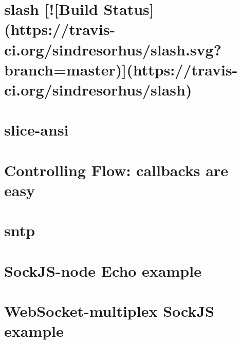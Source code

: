 \documentclass[twoside]{book}
\newcommand{\+}{\discretionary{\mbox{\scriptsize$\hookleftarrow$}}{}{}}
\begin{document}
\chapter{slash \mbox{[}!\mbox{[}Build Status\mbox{]}(https\+://travis-\/ci.org/sindresorhus/slash.svg?branch=master)\mbox{]}(https\+://travis-\/ci.org/sindresorhus/slash)}
\label{md__c_1_workspace_demo_src_main_script_node_modules_slash_readme}

\chapter{slice-\/ansi}
\label{md__c_1_workspace_demo_src_main_script_node_modules_slice-ansi_readme}

\chapter{Controlling Flow\+: callbacks are easy}
\label{md__c_1_workspace_demo_src_main_script_node_modules_slide__r_e_a_d_m_e}

\chapter{sntp}
\label{md__c_1_workspace_demo_src_main_script_node_modules_sntp__r_e_a_d_m_e}

\chapter{Sock\+J\+S-\/node Echo example}
\label{md__c_1_workspace_demo_src_main_script_node_modules_sockjs_examples_echo__r_e_a_d_m_e}

\chapter{Web\+Socket-\/multiplex Sock\+JS example}
\label{md__c_1_workspace_demo_src_main_script_node_modules_sockjs_examples_multiplex__r_e_a_d_m_e}

\end{document}
